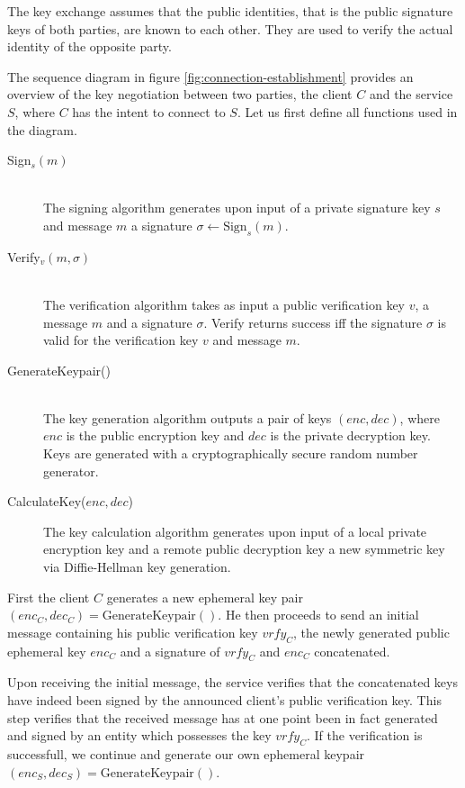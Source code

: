 The key exchange assumes that the public identities, that is the public signature keys of both parties, are known to each other.
They are used to verify the actual identity of the opposite party.

The sequence diagram in figure \ref{fig:connection-establishment} provides an overview of the key negotiation between two parties, the client $C$ and the service $S$, where $C$ has the intent to connect to $S$.
Let us first define all functions used in the diagram.

\begin{description}
    \item[Sign$_s(m)$]\hfill\\
        The signing algorithm generates upon input of a private signature key $s$ and message $m$ a signature $\sigma \leftarrow \text{Sign}_{s}(m)$.
    \item[Verify$_v(m, \sigma)$]\hfill\\
        The verification algorithm takes as input a public verification key $v$, a message $m$ and a signature $\sigma$.
        Verify returns success iff the signature $\sigma$ is valid for the verification key $v$ and message $m$.
    \item[GenerateKeypair()]\hfill\\
        The key generation algorithm outputs a pair of keys $(enc, dec)$, where $enc$ is the public encryption key and $dec$ is the private decryption key.
        Keys are generated with a cryptographically secure random number generator.
    \item[CalculateKey($enc, dec$)]
        The key calculation algorithm generates upon input of a local private encryption key and a remote public decryption key a new symmetric key via Diffie-Hellman key generation.
\end{description}

First the client $C$ generates a new ephemeral key pair $(enc_C, dec_C) = \text{GenerateKeypair}()$.
He then proceeds to send an initial message containing his public verification key $vrfy_C$, the newly generated public ephemeral key $enc_C$ and a signature of $vrfy_C$ and $enc_C$ concatenated.

Upon receiving the initial message, the service verifies that the concatenated keys have indeed been signed by the announced client's public verification key.
This step verifies that the received message has at one point been in fact generated and signed by an entity which possesses the key $vrfy_C$.
If the verification is successfull, we continue and generate our own ephemeral keypair $(enc_S, dec_S) = \text{GenerateKeypair}()$.

